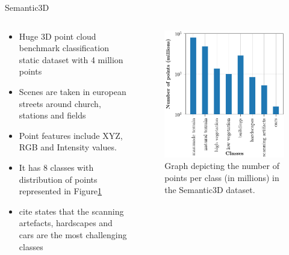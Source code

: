 \documentclass[aspectratio=169]{beamer}
\begin{document}
\begin{frame}{Semantic3D}
    \begin{columns}
        \begin{column}{0.5\textwidth}
            \begin{itemize}
                \item Huge 3D point cloud benchmark classification static dataset with 4 million points
                \item Scenes are taken in european streets around church, stations and fields
                \item Point features include XYZ, RGB and Intensity values.
                \item It has 8 classes with distribution of points represented in Figure\ref{fig:sem3d_stats}
                \item cite states that the scanning artefacts, hardscapes and cars are the most challenging classes
            \end{itemize}
        \end{column}
        \begin{column}{0.5\textwidth}
            \begin{figure}
                \centering
                \includegraphics[scale=0.22]{images/sem3d/sem3d_stats.jpg}
                \caption{Graph depicting the number of points per class (in millions) in the Semantic3D dataset.}
                \label{fig:sem3d_stats}
            \end{figure}
        \end{column}
    \end{columns}
\end{frame}
\end{document}
